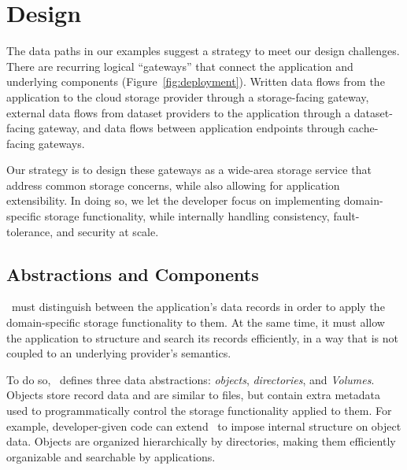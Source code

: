 \section{Design}
\label{sec:design}

The data paths in our examples suggest a strategy to meet our design challenges.
There are recurring logical ``gateways'' that
connect the application and underlying components
(Figure~\ref{fig:deployment}).  Written data flows from the
application to the cloud storage provider through a storage-facing
gateway, external data flows from dataset providers to the application
through a dataset-facing gateway, and data flows between application
endpoints through cache-facing gateways.

Our strategy is to design these gateways as a wide-area storage service that address common 
storage concerns, while also allowing for application extensibility.
In doing so, we let the developer focus on implementing
domain-specific storage functionality, while internally handling
consistency, fault-tolerance, and security at scale.


\subsection{Abstractions and Components}

\Syndicate\ must distinguish between the application's data records
in order to apply the domain-specific storage functionality to them.  At the same time, it must allow
the application to structure and search its records efficiently, in
a way that is not coupled to an underlying provider's semantics.

To do so, \Syndicate\ defines three data abstractions:
\textit{objects}, \textit{directories}, and \textit{Volumes}.  Objects
store record data and are similar to files, but contain extra metadata used to
programmatically control the storage functionality applied to them.
For example, developer-given code can extend \Syndicate\ to impose internal structure 
on object data.  Objects are organized hierarchically by directories, making them efficiently organizable
and searchable by applications.

